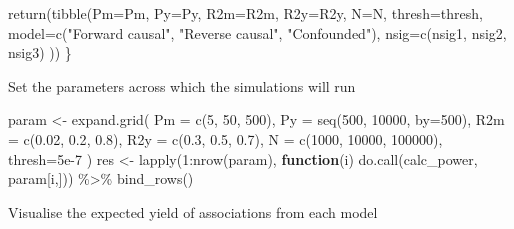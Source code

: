 \documentclass[
]{article}
\newenvironment{Shaded}{\begin{snugshade}}{\end{snugshade}}
\newcommand{\AttributeTok}[1]{\textcolor[rgb]{0.77,0.63,0.00}{#1}}
\newcommand{\ControlFlowTok}[1]{\textcolor[rgb]{0.13,0.29,0.53}{\textbf{#1}}}
\newcommand{\DecValTok}[1]{\textcolor[rgb]{0.00,0.00,0.81}{#1}}
\newcommand{\FloatTok}[1]{\textcolor[rgb]{0.00,0.00,0.81}{#1}}
\newcommand{\FunctionTok}[1]{\textcolor[rgb]{0.00,0.00,0.00}{#1}}
\newcommand{\NormalTok}[1]{#1}
\newcommand{\OtherTok}[1]{\textcolor[rgb]{0.56,0.35,0.01}{#1}}
\newcommand{\SpecialCharTok}[1]{\textcolor[rgb]{0.00,0.00,0.00}{#1}}
\newcommand{\StringTok}[1]{\textcolor[rgb]{0.31,0.60,0.02}{#1}}
\begin{document}
\begin{Shaded}
\begin{Highlighting}[]
  \FunctionTok{return}\NormalTok{(}\FunctionTok{tibble}\NormalTok{(}\AttributeTok{Pm=}\NormalTok{Pm, }\AttributeTok{Py=}\NormalTok{Py, }\AttributeTok{R2m=}\NormalTok{R2m, }\AttributeTok{R2y=}\NormalTok{R2y, }\AttributeTok{N=}\NormalTok{N, }\AttributeTok{thresh=}\NormalTok{thresh, }
                \AttributeTok{model=}\FunctionTok{c}\NormalTok{(}\StringTok{"Forward causal"}\NormalTok{, }\StringTok{"Reverse causal"}\NormalTok{, }\StringTok{"Confounded"}\NormalTok{), }
                \AttributeTok{nsig=}\FunctionTok{c}\NormalTok{(nsig1, nsig2, nsig3)}
\NormalTok{  ))}
\NormalTok{\}}
\end{Highlighting}
\end{Shaded}

Set the parameters across which the simulations will run

\begin{Shaded}
\begin{Highlighting}[]
\NormalTok{param }\OtherTok{\textless{}{-}} \FunctionTok{expand.grid}\NormalTok{(}
  \AttributeTok{Pm =} \FunctionTok{c}\NormalTok{(}\DecValTok{5}\NormalTok{, }\DecValTok{50}\NormalTok{, }\DecValTok{500}\NormalTok{),}
  \AttributeTok{Py =} \FunctionTok{seq}\NormalTok{(}\DecValTok{500}\NormalTok{, }\DecValTok{10000}\NormalTok{, }\AttributeTok{by=}\DecValTok{500}\NormalTok{),}
  \AttributeTok{R2m =} \FunctionTok{c}\NormalTok{(}\FloatTok{0.02}\NormalTok{, }\FloatTok{0.2}\NormalTok{, }\FloatTok{0.8}\NormalTok{),}
  \AttributeTok{R2y =} \FunctionTok{c}\NormalTok{(}\FloatTok{0.3}\NormalTok{, }\FloatTok{0.5}\NormalTok{, }\FloatTok{0.7}\NormalTok{),}
  \AttributeTok{N =} \FunctionTok{c}\NormalTok{(}\DecValTok{1000}\NormalTok{, }\DecValTok{10000}\NormalTok{, }\DecValTok{100000}\NormalTok{),}
  \AttributeTok{thresh=}\FloatTok{5e{-}7}
\NormalTok{)}
\NormalTok{res }\OtherTok{\textless{}{-}} \FunctionTok{lapply}\NormalTok{(}\DecValTok{1}\SpecialCharTok{:}\FunctionTok{nrow}\NormalTok{(param), }\ControlFlowTok{function}\NormalTok{(i) }\FunctionTok{do.call}\NormalTok{(calc\_power, param[i,])) }\SpecialCharTok{\%\textgreater{}\%} \FunctionTok{bind\_rows}\NormalTok{()}
\end{Highlighting}
\end{Shaded}

Visualise the expected yield of associations from each model
\end{document}
